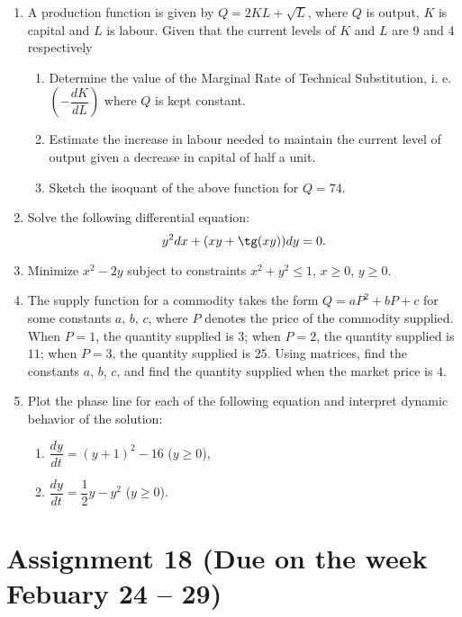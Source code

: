 \documentclass[12pt]{article} %
\theoremstyle{definition} %
\begin{document}
\begin{enumerate}
\item A production function is given by $Q=2KL+\sqrt{L}$, where $Q$ is output, $K$ is capital and $L$ is labour. Given that the current levels of $K$ and $L$ are 9 and 4 respectively
    \begin{enumerate}
    \item Determine the value of the Marginal Rate of Technical Substitution, i. e. $\left(-\dfrac{dK}{dL}\right)$ where $Q$ is kept constant.
    \item Estimate the increase in labour needed to maintain the current level of output given a decrease in capital of half a unit.
    \item Sketch the isoquant of the above function for $Q = 74$.
\end{enumerate}

\item Solve the following differential equation: 
\[
	y^2 dx+(xy+\tg(xy)) dy=0.
\]

\item Minimize $x^2-2y$ subject to constraints $x^2+y^2\leq 1$, $x\geq 0$, $y\geq 0$.

\item The supply function for a commodity takes the form $Q=aP^2+bP+c$ for some constants $a$, $b$, $c$, where $P$ denotes the price of the commodity supplied. When $P = 1$, the quantity supplied is $3$; when $P =2$, the quantity supplied is $11$; when $P = 3$, the quantity supplied is $25$. Using matrices, find the constants $a$, $b$, $c$, and find the quantity supplied when the market price is $4$.

\item Plot the phase line for each of the following equation and interpret dynamic behavior of the solution:
\begin{enumerate}
\item $\dfrac{dy}{dt}=(y+1)^2-16$ ($y\geq 0$),
\item $\dfrac {dy}{dt}=\dfrac 12y-y^2$ ($y\geq 0$).
\end{enumerate}
\end{enumerate}



\section*{Assignment 18 (Due on the week Febuary 24 – 29)}
\end{document}
